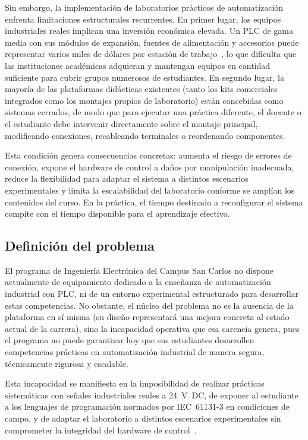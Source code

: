 \documentclass[12pt,a4paper,oneside]{report}
\begin{document}
Sin embargo, la implementación de laboratorios prácticos de automatización enfrenta limitaciones estructurales recurrentes. En primer lugar, los equipos industriales reales implican una inversión económica elevada. Un PLC de gama media con sus módulos de expansión, fuentes de alimentación y accesorios puede representar varios miles de dólares por estación de trabajo~\cite{ref3}, lo que dificulta que las instituciones académicas adquieran y mantengan equipos en cantidad suficiente para cubrir grupos numerosos de estudiantes. En segundo lugar, la mayoría de las plataformas didácticas existentes (tanto los kits comerciales integrados como los montajes propios de laboratorio) están concebidas como sistemas cerrados, de modo que para ejecutar una práctica diferente, el docente o el estudiante debe intervenir directamente sobre el montaje principal, modificando conexiones, recableando terminales o reordenando componentes.

Esta condición genera consecuencias concretas: aumenta el riesgo de errores de conexión, expone el hardware de control a daños por manipulación inadecuada, reduce la flexibilidad para adaptar el sistema a distintos escenarios experimentales y limita la escalabilidad del laboratorio conforme se amplían los contenidos del curso. En la práctica, el tiempo destinado a reconfigurar el sistema compite con el tiempo disponible para el aprendizaje efectivo.

\subsection{Definición del problema}

El programa de Ingeniería Electrónica del Campus San Carlos no dispone actualmente de equipamiento dedicado a la enseñanza de automatización industrial con PLC, ni de un entorno experimental estructurado para desarrollar estas competencias. No obstante, el núcleo del problema no es la ausencia de la plataforma en sí misma (su diseño representará una mejora concreta al estado actual de la carrera), sino la incapacidad operativa que esa carencia genera, pues el programa no puede garantizar hoy que sus estudiantes desarrollen competencias prácticas en automatización industrial de manera segura, técnicamente rigurosa y escalable.

Esta incapacidad se manifiesta en la imposibilidad de realizar prácticas sistemáticas con señales industriales reales a 24~V~DC, de exponer al estudiante a los lenguajes de programación normados por IEC~61131-3 en condiciones de campo, y de adaptar el laboratorio a distintos escenarios experimentales sin comprometer la integridad del hardware de control~\cite{ref3,ref4}.
\end{document}
